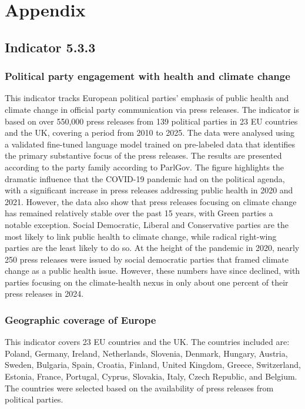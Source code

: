 \documentclass[
  letterpaper,
  DIV=11,
  numbers=noendperiod]{scrartcl}
\begin{document}
\newpage

\section{Appendix}\label{appendix}

\subsection{Indicator 5.3.3}\label{indicator-5.3.3}

\subsubsection{Political party engagement with health and climate
change}\label{political-party-engagement-with-health-and-climate-change}

This indicator tracks European political parties' emphasis of public
health and climate change in official party communication via press
releases. The indicator is based on over 550,000 press releases from 139
political parties in 23 EU countries and the UK, covering a period from
2010 to 2025. The data were analysed using a validated fine-tuned
language model trained on pre-labeled data that identifies the primary
substantive focus of the press releases. The results are presented
according to the party family according to ParlGov. The figure
highlights the dramatic influence that the COVID-19 pandemic had on the
political agenda, with a significant increase in press releases
addressing public health in 2020 and 2021. However, the data also show
that press releases focusing on climate change has remained relatively
stable over the past 15 years, with Green parties a notable exception.
Social Democratic, Liberal and Conservative parties are the most likely
to link public health to climate change, while radical right-wing
parties are the least likely to do so. At the height of the pandemic in
2020, nearly 250 press releases were issued by social democratic parties
that framed climate change as a public health issue. However, these
numbers have since declined, with parties focusing on the climate-health
nexus in only about one percent of their press releases in 2024.

\subsubsection{Geographic coverage of
Europe}\label{geographic-coverage-of-europe}

This indicator covers 23 EU countries and the UK. The countries included
are: Poland, Germany, Ireland, Netherlands, Slovenia, Denmark, Hungary,
Austria, Sweden, Bulgaria, Spain, Croatia, Finland, United Kingdom,
Greece, Switzerland, Estonia, France, Portugal, Cyprus, Slovakia, Italy,
Czech Republic, and Belgium. The countries were selected based on the
availability of press releases from political parties.
\end{document}
